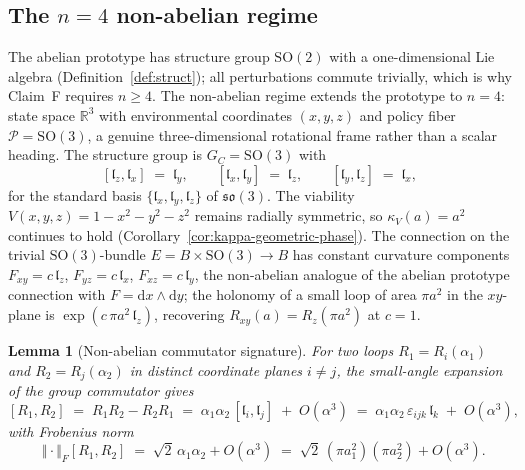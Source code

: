 \documentclass[11pt,a4paper]{article}
\theoremstyle{plain}
\newtheorem{lemma}[theorem]{Lemma}
\theoremstyle{definition}
\theoremstyle{remark}
\newcommand{\kk}{\kappa_{\!V}}
\newcommand{\RR}{\mathbb{R}}
\newcommand{\SO}{\mathrm{SO}}
\newcommand{\so}{\mathfrak{so}}
\newcommand{\Frob}{\!\operatorname{}\!\mathopen{}\Vert\cdot\mathclose{}\Vert_{\!F}}
\begin{document}
\subsection{The $n=4$ non-abelian regime}\label{sec:verdict-n4}

The abelian prototype has structure group $\SO(2)$ with a
one-dimensional Lie algebra (Definition~\ref{def:struct}); all
perturbations commute trivially, which is why Claim~F requires
$n\geq4$. The non-abelian regime extends the prototype to $n=4$:
state space $\RR^{3}$ with environmental coordinates $(x,y,z)$ and
policy fiber $\mathcal{P}=\SO(3)$, a genuine three-dimensional
rotational frame rather than a scalar heading. The structure group
is $G_{C}=\SO(3)$ with
\begin{equation}\label{eq:so3comm}
  [\mathfrak{l}_z, \mathfrak{l}_x] \;=\; \mathfrak{l}_y,\qquad
  [\mathfrak{l}_x, \mathfrak{l}_y] \;=\; \mathfrak{l}_z,\qquad
  [\mathfrak{l}_y, \mathfrak{l}_z] \;=\; \mathfrak{l}_x,
\end{equation}
for the standard basis
$\{\mathfrak{l}_x,\mathfrak{l}_y,\mathfrak{l}_z\}$ of $\so(3)$. The
viability $V(x,y,z)=1-x^{2}-y^{2}-z^{2}$ remains radially
symmetric, so $\kk(a)=a^{2}$ continues to hold
(Corollary~\ref{cor:kappa-geometric-phase}). The connection on the
trivial $\SO(3)$-bundle $E=B\times\SO(3)\to B$ has constant
curvature components $F_{xy}=c\,\mathfrak{l}_z$,
$F_{yz}=c\,\mathfrak{l}_x$, $F_{xz}=c\,\mathfrak{l}_y$, the
non-abelian analogue of the abelian prototype connection with
$F=\mathrm{d}x\wedge\mathrm{d}y$; the holonomy of a small loop of
area $\pi a^{2}$ in the $xy$-plane is
$\exp(c\,\pi a^{2}\,\mathfrak{l}_z)$, recovering
$R_{xy}(a)=R_{z}(\pi a^{2})$ at $c=1$.

\begin{lemma}[Non-abelian commutator signature]\label{lem:comm}
For two loops $R_1=R_i(\alpha_1)$ and $R_2=R_j(\alpha_2)$ in
distinct coordinate planes $i\neq j$, the small-angle expansion of
the group commutator gives
\begin{equation}\label{eq:comm}
  [R_1, R_2] \;=\; R_1 R_2 - R_2 R_1 \;=\;
  \alpha_1\alpha_2\,[\mathfrak{l}_i, \mathfrak{l}_j] \;+\;
  O(\alpha^{3}) \;=\;
  \alpha_1\alpha_2\,\varepsilon_{ijk}\,\mathfrak{l}_k \;+\;
  O(\alpha^{3}),
\end{equation}
with Frobenius norm
\begin{equation}\label{eq:norm}
  \Frob{[R_1,R_2]} \;=\; \sqrt{2}\,\alpha_1\alpha_2 + O(\alpha^{3})
  \;=\; \sqrt{2}\,(\pi a_1^{2})(\pi a_2^{2}) + O(\alpha^{3}).
\end{equation}
\end{lemma}
\end{document}
